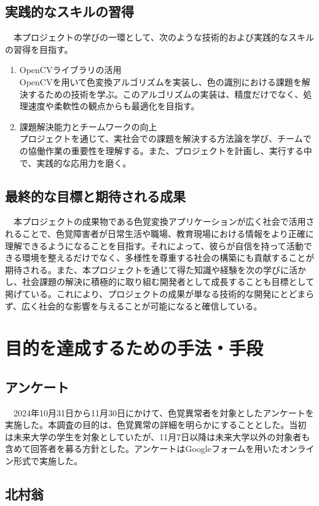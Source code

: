 \section{実践的なスキルの習得}
　本プロジェクトの学びの一環として、次のような技術的および実践的なスキルの習得を目指す。
\begin{enumerate}
  \item OpenCVライブラリの活用\\
  OpenCVを用いて色変換アルゴリズムを実装し、色の識別における課題を解決するための技術を学ぶ。このアルゴリズムの実装は、精度だけでなく、処理速度や柔軟性の観点からも最適化を目指す。\\
  \item 課題解決能力とチームワークの向上\\
  プロジェクトを通じて、実社会での課題を解決する方法論を学び、チームでの協働作業の重要性を理解する。また、プロジェクトを計画し、実行する中で、実践的な応用力を磨く。
\end{enumerate}
\section{最終的な目標と期待される成果}
　本プロジェクトの成果物である色覚変換アプリケーションが広く社会で活用されることで、色覚障害者が日常生活や職場、教育現場における情報をより正確に理解できるようになることを目指す。それによって、彼らが自信を持って活動できる環境を整えるだけでなく、多様性を尊重する社会の構築にも貢献することが期待される。また、本プロジェクトを通じて得た知識や経験を次の学びに活かし、社会課題の解決に積極的に取り組む開発者として成長することも目標として掲げている。これにより、プロジェクトの成果が単なる技術的な開発にとどまらず、広く社会的な影響を与えることが可能になると確信している。

\chapter{目的を達成するための手法・手段}
\section{アンケート}
　2024年10月31日から11月30日にかけて、色覚異常者を対象としたアンケートを実施した。本調査の目的は、色覚異常の詳細を明らかにすることとした。当初は未来大学の学生を対象としていたが、11月7日以降は未来大学以外の対象者も含めて回答者を募る方針とした。アンケートはGoogleフォームを用いたオンライン形式で実施した。
\section{北村翁}

